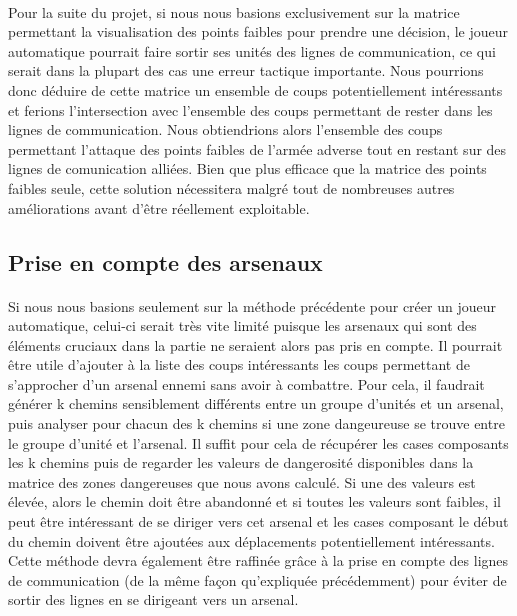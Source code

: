 		\paragraph{}
		Pour la suite du projet, si nous nous basions exclusivement sur la matrice permettant la visualisation des points faibles pour prendre une décision,
		le joueur automatique pourrait faire sortir ses unités des lignes de communication, ce qui serait dans la plupart des cas une erreur tactique importante.
		Nous pourrions donc déduire de cette matrice un ensemble de coups potentiellement intéressants et ferions l'intersection avec l'ensemble
		des coups permettant de rester dans les lignes de communication. Nous obtiendrions alors l'ensemble des coups permettant l'attaque des points faibles
		de l'armée adverse tout en restant sur des lignes de comunication alliées.
		Bien que plus efficace que la matrice des points faibles seule, cette solution nécessitera malgré tout de nombreuses autres améliorations avant d'être
		réellement exploitable.
		
		\subsection{Prise en compte des arsenaux}
		
		\paragraph{}
		Si nous nous basions seulement sur la méthode précédente pour créer un joueur automatique, celui-ci serait très vite limité puisque les arsenaux qui sont des
		éléments cruciaux dans la partie ne seraient alors pas pris en compte.
		Il pourrait être utile d'ajouter à la liste des coups intéressants les coups permettant de s'approcher d'un arsenal ennemi sans avoir à combattre.
		Pour cela, il faudrait générer k chemins sensiblement différents entre un groupe d'unités et un arsenal, puis analyser pour chacun des k chemins si une 
		zone dangeureuse se trouve entre le groupe d'unité et l'arsenal.
		Il suffit pour cela de récupérer les cases composants les k chemins puis de regarder les valeurs de dangerosité disponibles dans la matrice des zones dangereuses
		que nous avons calculé.
		Si une des valeurs est élevée, alors le chemin doit être abandonné et si toutes les valeurs sont faibles, il peut être intéressant de se diriger vers cet
		arsenal et les cases composant le début du chemin doivent être ajoutées aux déplacements potentiellement intéressants.
		Cette méthode devra également être raffinée grâce à la prise en compte des lignes de communication (de la même façon qu'expliquée précédemment) pour éviter de 
		sortir des lignes en se dirigeant vers un arsenal.

